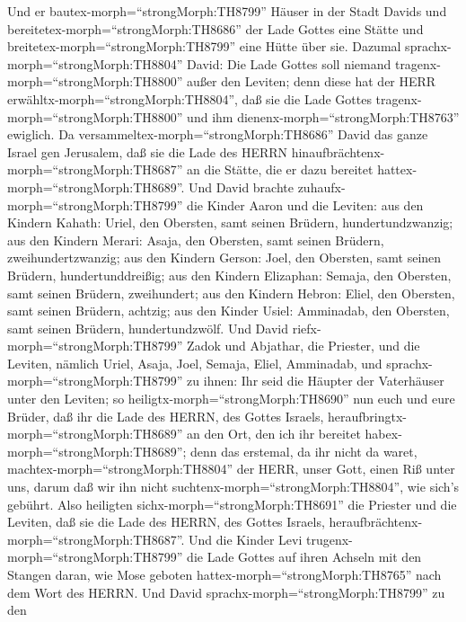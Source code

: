  Und er bautex-morph=``strongMorph:TH8799'' Häuser in der
Stadt Davids und bereitetex-morph=``strongMorph:TH8686'' der Lade Gottes
eine Stätte und breitetex-morph=``strongMorph:TH8799'' eine Hütte über
sie.  Dazumal sprachx-morph=``strongMorph:TH8804'' David:
Die Lade Gottes soll niemand tragenx-morph=``strongMorph:TH8800'' außer
den Leviten; denn diese hat der HERR
erwähltx-morph=``strongMorph:TH8804'', daß sie die Lade Gottes
tragenx-morph=``strongMorph:TH8800'' und ihm
dienenx-morph=``strongMorph:TH8763'' ewiglich.  Da
versammeltex-morph=``strongMorph:TH8686'' David das ganze Israel gen
Jerusalem, daß sie die Lade des HERRN
hinaufbrächtenx-morph=``strongMorph:TH8687'' an die Stätte, die er dazu
bereitet hattex-morph=``strongMorph:TH8689''.  Und David
brachte zuhaufx-morph=``strongMorph:TH8799'' die Kinder Aaron und die
Leviten:  aus den Kindern Kahath: Uriel, den Obersten, samt
seinen Brüdern, hundertundzwanzig;  aus den Kindern Merari:
Asaja, den Obersten, samt seinen Brüdern, zweihundertzwanzig;
 aus den Kindern Gerson: Joel, den Obersten, samt seinen
Brüdern, hundertunddreißig;  aus den Kindern Elizaphan:
Semaja, den Obersten, samt seinen Brüdern, zweihundert;  aus
den Kindern Hebron: Eliel, den Obersten, samt seinen Brüdern, achtzig;
 aus den Kinder Usiel: Amminadab, den Obersten, samt seinen
Brüdern, hundertundzwölf.  Und David
riefx-morph=``strongMorph:TH8799'' Zadok und Abjathar, die Priester, und
die Leviten, nämlich Uriel, Asaja, Joel, Semaja, Eliel, Amminadab,
 und sprachx-morph=``strongMorph:TH8799'' zu ihnen: Ihr
seid die Häupter der Vaterhäuser unter den Leviten; so
heiligtx-morph=``strongMorph:TH8690'' nun euch und eure Brüder, daß ihr
die Lade des HERRN, des Gottes Israels,
heraufbringtx-morph=``strongMorph:TH8689'' an den Ort, den ich ihr
bereitet habex-morph=``strongMorph:TH8689'';  denn das
erstemal, da ihr nicht da waret, machtex-morph=``strongMorph:TH8804''
der HERR, unser Gott, einen Riß unter uns, darum daß wir ihn nicht
suchtenx-morph=``strongMorph:TH8804'', wie sich's gebührt. 
Also heiligten sichx-morph=``strongMorph:TH8691'' die Priester und die
Leviten, daß sie die Lade des HERRN, des Gottes Israels,
heraufbrächtenx-morph=``strongMorph:TH8687''.  Und die
Kinder Levi trugenx-morph=``strongMorph:TH8799'' die Lade Gottes auf
ihren Achseln mit den Stangen daran, wie Mose geboten
hattex-morph=``strongMorph:TH8765'' nach dem Wort des HERRN.
 Und David sprachx-morph=``strongMorph:TH8799'' zu den
